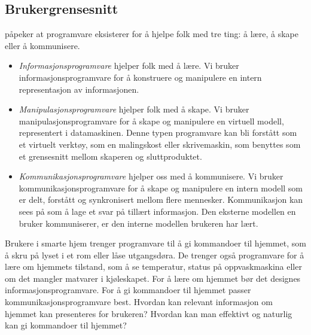 \subsection{Brukergrensesnitt}
\citet{victor06} påpeker at programvare eksisterer for å hjelpe folk med tre ting: å lære, å skape eller å kommunisere.
\begin{itemize}
\item \emph{Informasjonsprogramvare} hjelper folk med å lære. Vi bruker informasjonsprogramvare for å konstruere og manipulere en intern representasjon av informasjonen.
\item \emph{Manipulasjonsprogramvare} hjelper folk med å skape. Vi bruker manipulasjonsprogramvare for å skape og manipulere en virtuell modell, representert i datamaskinen. Denne typen programvare kan bli forstått som et virtuelt verktøy, som en malingskost eller skrivemaskin, som benyttes som et grensesnitt mellom skaperen og sluttproduktet.
\item \emph{Kommunikasjonsprogramvare} hjelper oss med å kommunisere. Vi bruker kommunikasjonsprogramvare for å skape og manipulere en intern modell som er delt, forstått og synkronisert mellom flere mennesker. Kommunikasjon kan sees på som å lage et svar på tillært informasjon. Den eksterne modellen en bruker kommuniserer, er den interne modellen brukeren har lært.
\end{itemize}
Brukere i smarte hjem trenger programvare til å gi kommandoer til hjemmet, som å skru på lyset i et rom eller låse utgangsdøra. De trenger også programvare for å lære om hjemmets tilstand, som å se temperatur, status på oppvaskmaskina eller om det mangler matvarer i kjøleskapet. For å lære om hjemmet bør det designes informasjonsprogramvare. For å gi kommandoer til hjemmet passer kommunikasjonsprogramvare best. Hvordan kan relevant informasjon om hjemmet kan presenteres for brukeren? Hvordan kan man effektivt og naturlig kan gi kommandoer til hjemmet? 

